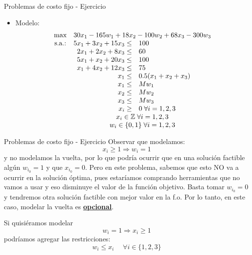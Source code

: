 \documentclass[10pt, aspectratio=169]{beamer}
\begin{document}
\begin{frame}{Problemas de costo fijo - Ejercicio}
    \begin{itemize}

        \item Modelo:
        \[\begin{array}{crl}
            \max & \multicolumn{2}{c}{30x_1-165w_1 + 18x_2-100w_2+68x_3-300w_3}  \\
            \text{s.a.:} & 5x_1 + 3x_2 + 15x_3 \leq& 100 \\
             & 2x_1+2x_2+8x_3 \leq & 60 \\
             & 5x_1+x_2+20x_3 \leq & 100 \\
             & x_1+4x_2+12x_3 \leq & 75 \\
             & x_1 \leq & 0.5(x_1 + x_2 + x_3) \\
             & x_1 \leq & Mw_1 \\
             & x_2 \leq & Mw_2 \\
             & x_3 \leq & Mw_3 \\
             & x_i \geq & 0 \; \forall i=1,2,3 \\
             & \multicolumn{2}{c}{x_i\in\mathbb{Z} \; \forall i=1,2,3} \\
             & \multicolumn{2}{c}{w_i\in\{0,1\} \; \forall i=1,2,3}\\
        \end{array}
        \]
        
    \end{itemize}
\end{frame}

\begin{frame}{Problemas de costo fijo - Ejercicio}
    Observar que modelamos:
    \[ x_i \geq 1 \Rightarrow w_i = 1\]
    y no modelamos la vuelta, por lo que podría ocurrir que en una solución factible algún $w_{i_0}=1$
    y que $x_{i_0}=0$. Pero en este problema, sabemos que esto NO va a ocurrir en la solución óptima,
    pues estaríamos comprando herramientas que no vamos a usar y eso disminuye el valor de la función objetivo.
    Basta tomar $w_{i_0}=0$ y tendremos otra solución factible con mejor valor en la f.o.
    Por lo tanto, en este caso,  modelar la vuelta es \underline{\textbf{opcional}}.

    Si quisiéramos modelar
    \[ w_i = 1 \Rightarrow x_i \geq 1\]
    podríamos agregar las restricciones: \pause
    \[w_i \leq x_i \quad\;\forall i\in \{1,2,3\}\]
\end{frame}    
\fi
\end{document}
